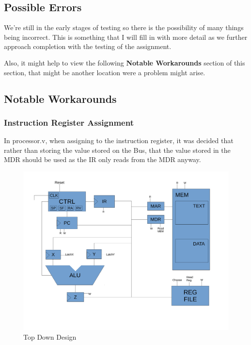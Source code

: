 \documentclass[conference]{IEEEtran}
\begin{document}
\subsection{Possible Errors}
We're still in the early stages of testing so there is the possibility of many things 
being incorrect. This is something that I will fill in with more detail as we 
further approach completion with the testing of the assignment.

Also, it might help to view the following \textbf{Notable Workarounds} section
of this section, that might be another location were a problem might arise.

\subsection{Notable Workarounds}
\subsubsection{Instruction Register Assignment}
In processor.v, when assigning to the instruction register, it was decided 
that rather than storing the value stored on the Bus, that the value stored
in the MDR should be used as the IR only reads from the MDR anyway.



\clearpage 

\begin{figure}[!t]
\centering
\includegraphics[width=\textwidth]{TopDownDesignDraftp1.pdf}
\caption{Top Down Design}
\label{fig_sim}
\end{figure}
\end{document}
